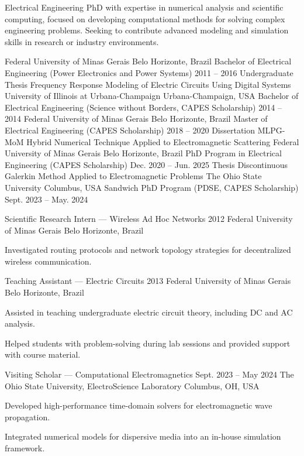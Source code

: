 \documentclass[11pt]{cv}
\begin{document}
\makeprofileheader

\begin{Objective}
    Electrical Engineering PhD with expertise in numerical analysis
    and scientific computing, focused on developing computational
    methods for solving complex engineering problems. Seeking to
    contribute advanced modeling and simulation skills in research or
    industry environments.
\end{Objective}

\begin{Education}
    \educationitem
    {Federal University of Minas Gerais}
    {Belo Horizonte, Brazil}
    {Bachelor of Electrical Engineering (Power Electronics and Power Systems)}
    {2011 -- 2016}
    {Undergraduate Thesis}
    {Frequency Response Modeling of Electric Circuits Using Digital Systems}
    \educationitem
    {University of Illinois at Urbana-Champaign}
    {Urbana-Champaign, USA}
    {Bachelor of Electrical Engineering (Science without Borders,
    CAPES Scholarship)}
    {2014 -- 2014}
    {}
    {}
    \educationitem
    {Federal University of Minas Gerais}
    {Belo Horizonte, Brazil}
    {Master of Electrical Engineering (CAPES Scholarship)}
    {2018 -- 2020}
    {Dissertation}
    {MLPG-MoM Hybrid Numerical Technique Applied to Electromagnetic Scattering}
    \educationitem
    {Federal University of Minas Gerais}
    {Belo Horizonte, Brazil}
    {PhD Program in Electrical Engineering (CAPES Scholarship)}
    {Dec. 2020 -- Jun. 2025}
    {Thesis}
    {Discontinuous Galerkin Method Applied to Electromagnetic Problems}
    \educationitem
    {The Ohio State University}
    {Columbus, USA}
    {Sandwich PhD Program (PDSE, CAPES Scholarship)}
    {Sept. 2023 -- May. 2024}
    {}
    {}
\end{Education}

\begin{Experience}
    \experienceitem
    {Scientific Research Intern — Wireless Ad Hoc Networks}
    {2012}
    {Federal University of Minas Gerais}
    {Belo Horizonte, Brazil}
    {
    \item Investigated routing protocols and network topology
        strategies for decentralized wireless communication.
    }
    \experienceitem
    {Teaching Assistant — Electric Circuits}
    {2013}
    {Federal University of Minas Gerais}
    {Belo Horizonte, Brazil}
    {
    \item Assisted in teaching undergraduate electric circuit theory,
        including DC and AC analysis.
    \item Helped students with problem-solving during lab sessions
        and provided support with course material.
    }
    \experienceitem
    {Visiting Scholar — Computational Electromagnetics}
    {Sept. 2023 -- May 2024}
    {The Ohio State University, ElectroScience Laboratory}
    {Columbus, OH, USA}
    {
    \item Developed high-performance time-domain solvers for
        electromagnetic wave propagation.
    \item Integrated numerical models for dispersive media into an
        in-house simulation framework.
    }
\end{Experience}
\end{document}
